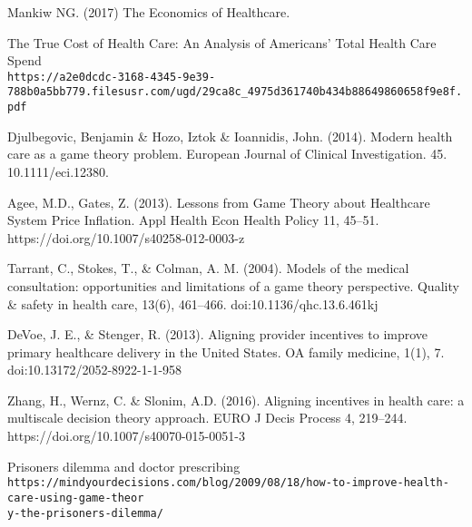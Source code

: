 \documentclass{article}
\begin{document}
\begin{thebibliography}{9}

Mankiw NG. (2017) The Economics of Healthcare.

The True Cost of Health Care: An Analysis of Americans’ Total Health Care Spend
\\\texttt{https://a2e0dcdc-3168-4345-9e39-788b0a5bb779.filesusr.com/ugd/29ca8c_4975d361740b434b88649860658f9e8f.pdf}

Djulbegovic, Benjamin \& Hozo, Iztok \& Ioannidis, John. (2014). Modern health care as a game theory problem. European Journal of Clinical Investigation. 45. 10.1111/eci.12380.

Agee, M.D., Gates, Z. (2013). Lessons from Game Theory about Healthcare System Price Inflation. Appl Health Econ Health Policy 11, 45–51. https://doi.org/10.1007/s40258-012-0003-z

Tarrant, C., Stokes, T., \& Colman, A. M. (2004). Models of the medical consultation: opportunities and limitations of a game theory perspective. Quality \& safety in health care, 13(6), 461–466. doi:10.1136/qhc.13.6.461kj

DeVoe, J. E., \& Stenger, R. (2013). Aligning provider incentives to improve primary healthcare delivery in the United States. OA family medicine, 1(1), 7. doi:10.13172/2052-8922-1-1-958

Zhang, H., Wernz, C. \& Slonim, A.D. (2016). Aligning incentives in health care: a multiscale decision theory approach. EURO J Decis Process 4, 219–244. https://doi.org/10.1007/s40070-015-0051-3

Prisoners dilemma and doctor prescribing
\\\texttt{https://mindyourdecisions.com/blog/2009/08/18/how-to-improve-health-care-using-game-theor\\y-the-prisoners-dilemma/}

\end{thebibliography}

\end{document}
